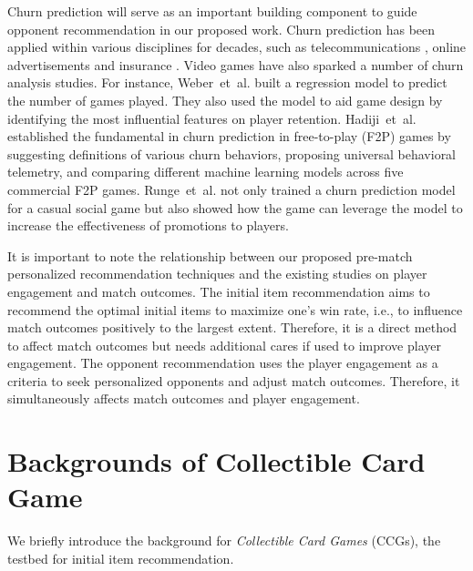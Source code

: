 Churn prediction will serve as an important building component to guide opponent recommendation in our proposed work. Churn prediction has been applied within various disciplines for decades, such as telecommunications \cite{ferreira2004data}, online advertisements \cite{yoon2010prediction} and insurance \cite{morik2004analysing}. Video games have also sparked a number of churn analysis studies. For instance, Weber~et~al. \cite{weber2011modeling} built a regression model to predict the number of games played. They also used the model to aid game design by identifying the most influential features on player retention. Hadiji~et~al. \cite{hadiji2014predicting} established the fundamental in churn prediction in free-to-play (F2P) games by suggesting definitions of various churn behaviors, proposing universal behavioral telemetry, and comparing different machine learning models across five commercial F2P games. Runge~et~al. \cite{runge2014churn} not only trained a churn prediction model for a casual social game but also showed how the game can leverage the model to increase the effectiveness of promotions to players. 

It is important to note the relationship between our proposed pre-match personalized recommendation techniques and the existing studies on player engagement and match outcomes. The initial item recommendation aims to recommend the optimal initial items to maximize one's win rate, i.e., to influence match outcomes positively to the largest extent. Therefore, it is a direct method to affect match outcomes but needs additional cares if used to improve player engagement. The opponent recommendation uses the player engagement as a criteria to seek personalized opponents and adjust match outcomes. Therefore, it simultaneously affects match outcomes and player engagement.


\section{Backgrounds of Collectible Card Game}
We briefly introduce the background for \textit{Collectible Card Games} (CCGs), the testbed for initial item recommendation.

